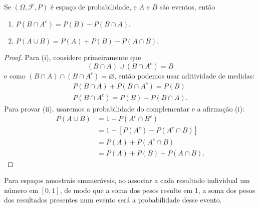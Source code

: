 \begin{prop:base calculo probabilidades 2}
\label{prop:base calculo probabilidades 2}
Se $(\Omega, \mathcal{F}, P)$ é espaço de probabilidade, e $A$ e $B$ são eventos, então
\begin{enumerate}
	\item[i] $P(B \cap A^c) = P(B) - P(B \cap A)$.
	\item[ii] $P(A \cup B) = P(A) + P(B) - P(A \cap B)$.
\end{enumerate}
\begin{proof}
	Para (i), considere primeiramente que
	\[
		(B \cap A) \cup (B \cap A^c) = B
	\]
	e como $(B \cap A) \cap (B \cap A^c) = \varnothing$, então podemos usar aditividade
	de medidas:
	\begin{gather*}
		P(B \cap A) + P(B \cap A^c) = P(B) \\
		P(B \cap A^c) = P(B) - P(B \cap A).
	\end{gather*}
	Para provar (ii), usaremos a probabilidade do complementar e a afirmação (i):
	\begin{align*}
		P(A \cup B) & = 1 - P(A^c \cap B^c)          \\
		            & = 1 - [P(A^c) - P(A^c \cap B)] \\
		            & = P(A) + P(A^c \cap B)         \\
		            & = P(A) + P(B) - P(A \cap B).
	\end{align*}
\end{proof}
\end{prop:base calculo probabilidades 2}

Para espaços amostrais enumeráveis, ao associar a cada resultado individual
um número em $[0, 1]$, de modo que a soma dos pesos resulte em 1, a soma dos pesos dos
resultados presentes num evento será a probabilidade desse evento.

